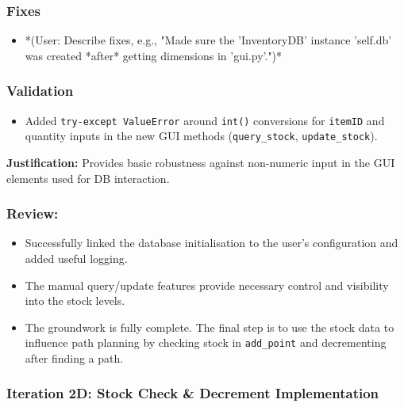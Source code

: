 \subsubsection{Fixes}
\begin{itemize}
	\item *(User: Describe fixes, e.g., "Made sure the 'InventoryDB' instance 'self.db' was created *after* getting dimensions in 'gui.py'.")*
\end{itemize}

\subsubsection{Validation}
\begin{itemize}
	\item Added \verb|try-except ValueError| around \verb|int()| conversions for \verb|itemID| and quantity inputs in the new GUI methods (\verb|query_stock|, \verb|update_stock|).
\end{itemize}
\textbf{Justification:} Provides basic robustness against non-numeric input in the GUI elements used for DB interaction.

\subsubsection{Review:}
\begin{itemize}
	\item Successfully linked the database initialisation to the user's configuration and added useful logging.
	\item The manual query/update features provide necessary control and visibility into the stock levels.
	\item The groundwork is fully complete. The final step is to use the stock data to influence path planning by checking stock in \verb|add_point| and decrementing after finding a path.
\end{itemize}

\newpage

\subsubsection{Iteration 2D: Stock Check \& Decrement Implementation}

